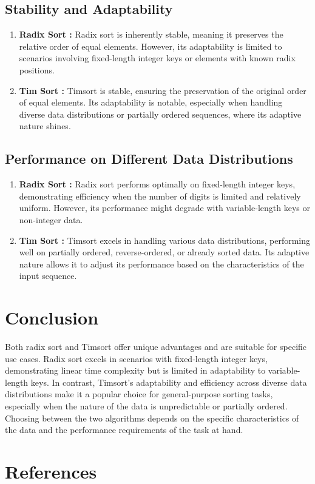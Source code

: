 \documentclass[conference]{IEEEtran}
\begin{document}
\subsection{Stability and Adaptability}
\begin{enumerate}
	\item \textbf{Radix Sort : } Radix sort is inherently stable, meaning it preserves the relative order of equal elements. However, its adaptability is limited to scenarios involving fixed-length integer keys or elements with known radix positions.
	\item \textbf{Tim Sort : } Timsort is stable, ensuring the preservation of the original order of equal elements. Its adaptability is notable, especially when handling diverse data distributions or partially ordered sequences, where its adaptive nature shines.
\end{enumerate}
\subsection{Performance on Different Data Distributions}\cite{1}
\begin{enumerate}
	\item \textbf{Radix Sort : } Radix sort performs optimally on fixed-length integer keys, demonstrating efficiency when the number of digits is limited and relatively uniform. However, its performance might degrade with variable-length keys or non-integer data.
	\item \textbf{Tim Sort : } Timsort excels in handling various data distributions, performing well on partially ordered, reverse-ordered, or already sorted data. Its adaptive nature allows it to adjust its performance based on the characteristics of the input sequence.
\end{enumerate}
\section{Conclusion}
Both radix sort  and Timsort offer unique  advantages and are suitable for specific use cases. Radix sort excels in scenarios with fixed-length integer keys, demonstrating linear time complexity but is limited in adaptability to variable-length keys. In contrast, Timsort's adaptability and efficiency across diverse data distributions make it a popular choice for general-purpose sorting tasks, especially when the nature of the data is unpredictable or partially ordered. Choosing between the two algorithms depends on the specific characteristics of the data and the performance requirements of the task at hand.
\section{References}


\end{document}
